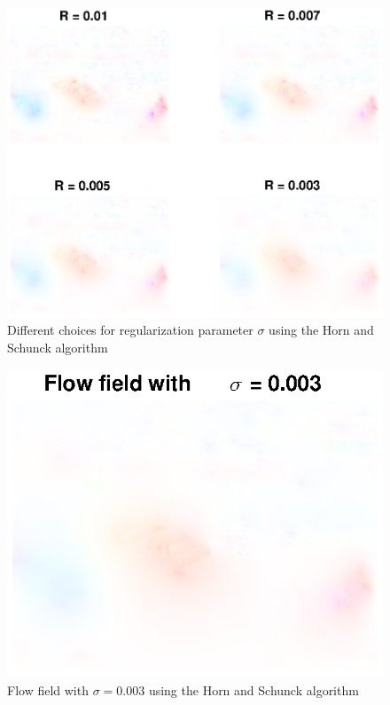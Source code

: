 \documentclass[10pt,a4paper]{article}
\begin{document}
\begin{figure}
    \centering
    \includegraphics[scale=0.8]{regularizationHS}
    \caption{Different choices for regularization parameter $\sigma$ using the Horn and Schunck algorithm}
    \label{reguHS}
\end{figure}

\begin{figure}
    \centering
    \includegraphics[scale=0.8]{HSregu}
    \caption{Flow field with $\sigma= 0.003$ using the Horn and Schunck algorithm}
    \label{reguHS_best}
\end{figure}
\end{document}
